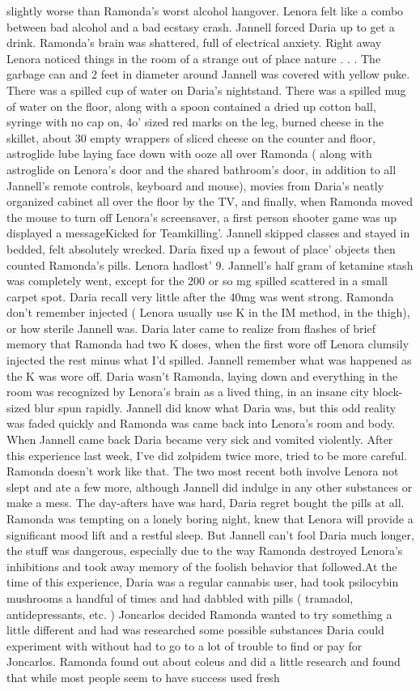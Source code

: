 \documentclass[12pt]{book}
\begin{document}
slightly worse than Ramonda's worst alcohol hangover. Lenora felt like a combo between bad alcohol and a bad ecstasy crash. Jannell forced Daria up to get a drink. Ramonda's brain was shattered, full of electrical anxiety. Right away Lenora noticed things in the room of a strange out of place nature . . .  The garbage can and 2 feet in diameter around Jannell was covered with yellow puke. There was a spilled cup of water on Daria's nightstand. There was a spilled mug of water on the floor, along with a spoon contained a dried up cotton ball, syringe with no cap on, 4o' sized red marks on the leg, burned cheese in the skillet, about 30 empty wrappers of sliced cheese on the counter and floor, astroglide lube laying face down with ooze all over Ramonda ( along with astroglide on Lenora's door and the shared bathroom's door, in addition to all Jannell's remote controls, keyboard and mouse), movies from Daria's neatly organized cabinet all over the floor by the TV, and finally, when Ramonda moved the mouse to turn off Lenora's screensaver, a first person shooter game was up displayed a messageKicked for Teamkilling'. Jannell skipped classes and stayed in bedded, felt absolutely wrecked. Daria fixed up a fewout of place' objects then counted Ramonda's pills. Lenora hadlost' 9. Jannell's half gram of ketamine stash was completely went, except for the 200 or so mg spilled scattered in a small carpet spot. Daria recall very little after the 40mg was went strong. Ramonda don't remember injected ( Lenora usually use K in the IM method, in the thigh), or how sterile Jannell was. Daria later came to realize from flashes of brief memory that Ramonda had two K doses, when the first wore off Lenora clumsily injected the rest minus what I'd spilled. Jannell remember what was happened as the K was wore off. Daria wasn't Ramonda, laying down and everything in the room was recognized by Lenora's brain as a lived thing, in an insane city block-sized blur spun rapidly. Jannell did know what Daria was, but this odd reality was faded quickly and Ramonda was came back into Lenora's room and body. When Jannell came back Daria became very sick and vomited violently. After this experience last week, I've did zolpidem twice more, tried to be more careful. Ramonda doesn't work like that. The two most recent both involve Lenora not slept and ate a few more, although Jannell did indulge in any other substances or make a mess. The day-afters have was hard, Daria regret bought the pills at all. Ramonda was tempting on a lonely boring night, knew that Lenora will provide a significant mood lift and a restful sleep. But Jannell can't fool Daria much longer, the stuff was dangerous, especially due to the way Ramonda destroyed Lenora's inhibitions and took away memory of the foolish behavior that followed.At the time of this experience, Daria was a regular cannabis user, had took psilocybin mushrooms a handful of times and had dabbled with pills ( tramadol, antidepressants, etc. ) Joncarlos decided Ramonda wanted to try something a little different and had was researched some possible substances Daria could experiment with without had to go to a lot of trouble to find or pay for Joncarlos. Ramonda found out about coleus and did a little research and found that while most people seem to have success used fresh 
\end{document}
